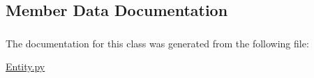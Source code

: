 \subsection{Member Data Documentation}
\hypertarget{classmmasgis_1_1Entity_1_1Odict_a44e442abee8c1fe66c5c1d52aea60b20}{
\subsubsection[{order}]{}}
\label{classmmasgis_1_1Entity_1_1Odict_a44e442abee8c1fe66c5c1d52aea60b20}


The documentation for this class was generated from the following file:\begin{DoxyCompactItemize}
\item 
\hyperlink{Entity_8py}{Entity.py}\end{DoxyCompactItemize}
